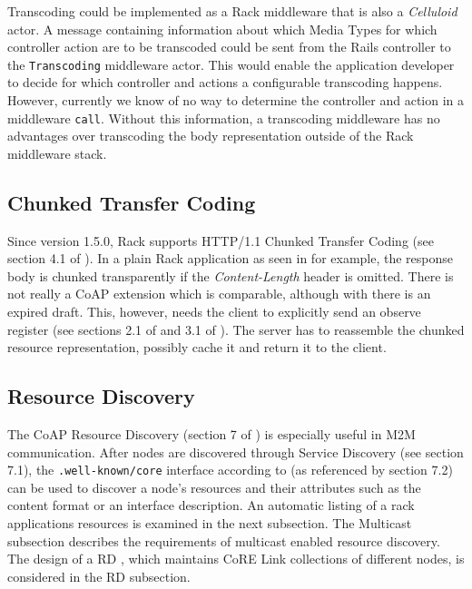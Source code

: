 		Transcoding could be implemented as a Rack middleware that is also a
		\emph{Celluloid} actor. A message containing information about which
		Media Types for which controller action are to be transcoded could be
		sent from the Rails controller to the \texttt{Transcoding} middleware
		actor. This would enable the application developer to decide for which
		controller and actions a configurable transcoding happens. However,
		currently we know of no way to determine the controller and action in a
		middleware \texttt{call}. Without this information, a transcoding
		middleware has no advantages over transcoding the body representation
		outside of the Rack middleware stack.

	\subsection{Chunked Transfer Coding}

		Since version 1.5.0, Rack supports \ac{HTTP}/1.1 Chunked Transfer
		Coding (see section 4.1 of \cite{http-0}). In a plain Rack application
		as seen in  for example, the response body is
		chunked transparently if the \emph{Content-Length} header is omitted.
		There is not really a \ac{CoAP} extension which is comparable, although
		with \cite{coap-streaming} there is an expired draft. This, however,
		needs the client to explicitly send an observe register (see sections
		2.1 of \cite{coap-streaming} and 3.1 of \cite{observe}). The server has
		to reassemble the chunked resource representation, possibly cache it
		and return it to the client.

	\subsection{Resource Discovery}

		The \ac{CoAP} Resource Discovery (section 7 of \cite{coap}) is
		especially useful in \ac{M2M} communication. After nodes are discovered
		through Service Discovery (see section 7.1), the
		\texttt{.well-known/core} interface according to \cite{link} (as
		referenced by section 7.2) can be used to discover a node's resources
		and their attributes such as the content format or an interface
		description. An automatic listing of a rack applications resources is
		examined in the next subsection. The Multicast subsection describes the
		requirements of multicast enabled resource discovery. The design of a
		\acf{RD} \cite{rd}, which maintains \ac{CoRE} Link collections of
		different nodes, is considered in the \acl{RD} subsection.

